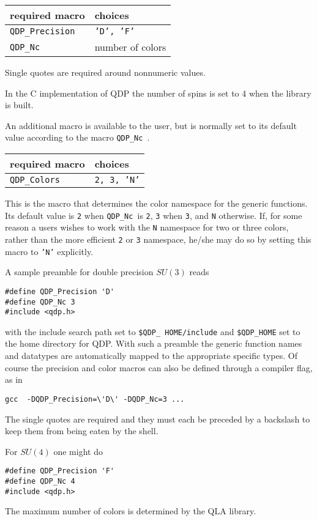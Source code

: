 \documentclass{article}
\newcommand{\namespace}{QDP}
\newcommand{\ttdash}{{\tt \_}}
\newcommand{\qdpNcMacro}{{\tt \namespace}\ttdash{\tt Nc }}
\newcommand{\qdpPrecisionMacro}{{\tt \namespace}\ttdash{\tt Precision}}
\newcommand{\qdpColorsMacro}{{\tt \namespace}\ttdash{\tt Colors}}
\begin{document}
\begin{center}
\begin{tabular}{|l|l|}
\hline
 required macro & choices \\
\hline
 \qdpPrecisionMacro & {\tt 'D', 'F'} \\
 \qdpNcMacro        & number of colors \\
\hline
\end{tabular}
\end{center}
%
Single quotes are required around nonnumeric values.  

In the C implementation of QDP the number of spins is set to 4 when
the library is built.

An additional macro is available to the user, but is
normally set to its default value according to the
macro \qdpNcMacro.
%
\begin{center}
\begin{tabular}{|l|l|}
\hline
 required macro & choices \\
\hline
 \qdpColorsMacro    & {\tt 2, 3, 'N'} \\
\hline
\end{tabular}
\end{center}
%
This is the macro that determines the color namespace for the generic
functions.  Its default value is {\tt 2} when \qdpNcMacro is {\tt 2},
{\tt 3} when {\tt 3}, and {\tt N} otherwise.  If, for some reason a
users wishes to work with the {\tt N} namespace for two or three
colors, rather than the more efficient {\tt 2} or {\tt 3} namespace,
he/she may do so by setting this macro to {\tt 'N'} explicitly.

A sample preamble for double precision $SU(3)$ reads
%
\begin{verbatim}
#define QDP_Precision 'D'
#define QDP_Nc 3
#include <qdp.h>
\end{verbatim}
%
with the include search path set to {\tt \$QDP}\ttdash{\tt
HOME/include} and {\tt \$QDP}\ttdash{\tt HOME} set to the home
directory for QDP\@.  With such a preamble the generic function names
and datatypes are automatically mapped to the appropriate specific
types.  Of course the precision and color macros can also be defined
through a compiler flag, as in
%
\begin{verbatim}
gcc  -DQDP_Precision=\'D\' -DQDP_Nc=3 ...
\end{verbatim}
%
The single quotes are required and they must each be preceded by a
backslash to keep them from being eaten by the shell.

For $SU(4)$ one might do
%
\begin{verbatim}
#define QDP_Precision 'F'
#define QDP_Nc 4
#include <qdp.h>
\end{verbatim}
%
The maximum number of colors is determined by the QLA library.
\end{document}
